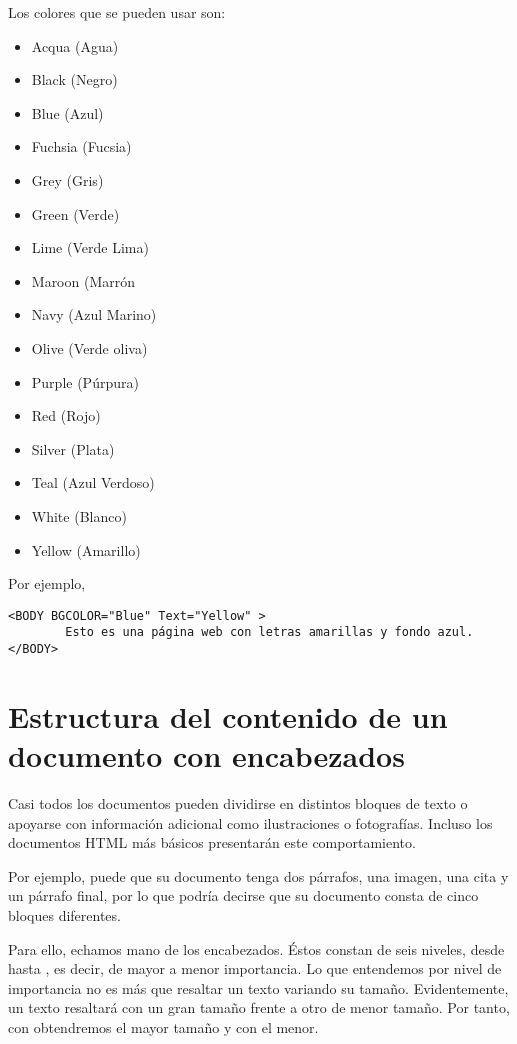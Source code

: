 Los colores que se pueden usar son:
\begin{itemize}
        \item Acqua (Agua)
        \item Black (Negro)
        \item Blue (Azul)
        \item Fuchsia (Fucsia)
        \item Grey (Gris)
        \item Green (Verde)
        \item Lime (Verde Lima)
        \item Maroon (Marrón
        \item Navy (Azul Marino)
        \item Olive (Verde oliva)
        \item Purple (Púrpura)
        \item Red (Rojo)
        \item Silver (Plata)
        \item Teal (Azul Verdoso)
        \item White (Blanco)
        \item Yellow (Amarillo)
\end{itemize}

Por ejemplo,

\begin{verbatim}
<BODY BGCOLOR="Blue" Text="Yellow" >
        Esto es una página web con letras amarillas y fondo azul.
</BODY>
\end{verbatim}

\section{Estructura del contenido de un documento con encabezados}

Casi todos  los documentos  pueden dividirse  en distintos  bloques de
texto  o  apoyarse  con  información adicional  como  ilustraciones  o
fotografías. Incluso los documentos  HTML más básicos presentarán este
comportamiento.

Por ejemplo,  puede que su  documento tenga dos párrafos,  una imagen,
una  cita  y un  párrafo  final,  por lo  que  podría  decirse que  su
documento consta de cinco bloques diferentes.

Para  ello, echamos  mano de  los encabezados.  Éstos constan  de seis
niveles, desde   hasta , es decir, de  mayor a menor
importancia.  Lo que  entendemos por  nivel de  importancia no  es más
que  resaltar un  texto variando  su tamaño.  Evidentemente, un  texto
resaltará con un gran tamaño frente a otro de menor tamaño. Por tanto,
con  obtendremos el mayor tamaño y con  el menor.

